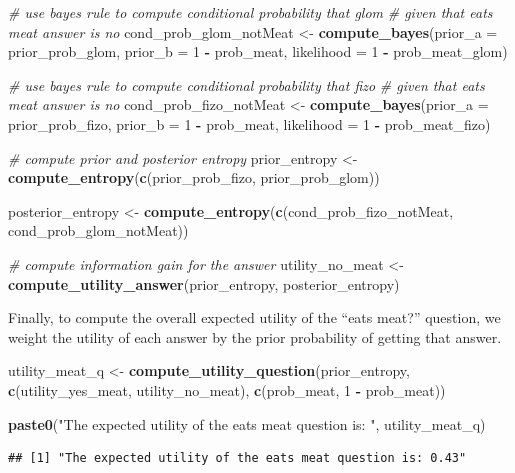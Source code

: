\documentclass[english,floatsintext,man]{apa6}
\newenvironment{Shaded}{\begin{snugshade}}{\end{snugshade}}
\newcommand{\KeywordTok}[1]{\textcolor[rgb]{0.13,0.29,0.53}{\textbf{#1}}}
\newcommand{\DataTypeTok}[1]{\textcolor[rgb]{0.13,0.29,0.53}{#1}}
\newcommand{\DecValTok}[1]{\textcolor[rgb]{0.00,0.00,0.81}{#1}}
\newcommand{\StringTok}[1]{\textcolor[rgb]{0.31,0.60,0.02}{#1}}
\newcommand{\CommentTok}[1]{\textcolor[rgb]{0.56,0.35,0.01}{\textit{#1}}}
\newcommand{\OperatorTok}[1]{\textcolor[rgb]{0.81,0.36,0.00}{\textbf{#1}}}
\newcommand{\NormalTok}[1]{#1}
\theoremstyle{definition}
\theoremstyle{definition}
\theoremstyle{definition}
\theoremstyle{remark}
\begin{document}
\begin{Shaded}
\begin{Highlighting}[]
\CommentTok{# use bayes rule to compute conditional probability that glom }
\CommentTok{# given that eats meat answer is no}
\NormalTok{cond_prob_glom_notMeat <-}\StringTok{ }\KeywordTok{compute_bayes}\NormalTok{(}\DataTypeTok{prior_a =}\NormalTok{ prior_prob_glom, }
                                        \DataTypeTok{prior_b =} \DecValTok{1} \OperatorTok{-}\StringTok{ }\NormalTok{prob_meat, }
                                        \DataTypeTok{likelihood =} \DecValTok{1} \OperatorTok{-}\StringTok{ }\NormalTok{prob_meat_glom)}

\CommentTok{# use bayes rule to compute conditional probability that fizo }
\CommentTok{# given that eats meat answer is no}
\NormalTok{cond_prob_fizo_notMeat <-}\StringTok{ }\KeywordTok{compute_bayes}\NormalTok{(}\DataTypeTok{prior_a =}\NormalTok{ prior_prob_fizo, }
                                        \DataTypeTok{prior_b =} \DecValTok{1} \OperatorTok{-}\StringTok{ }\NormalTok{prob_meat, }
                                        \DataTypeTok{likelihood =} \DecValTok{1} \OperatorTok{-}\StringTok{ }\NormalTok{prob_meat_fizo)}

\CommentTok{# compute prior and posterior entropy}
\NormalTok{prior_entropy <-}\StringTok{ }\KeywordTok{compute_entropy}\NormalTok{(}\KeywordTok{c}\NormalTok{(prior_prob_fizo, }
\NormalTok{                                   prior_prob_glom))}

\NormalTok{posterior_entropy <-}\StringTok{ }\KeywordTok{compute_entropy}\NormalTok{(}\KeywordTok{c}\NormalTok{(cond_prob_fizo_notMeat, }
\NormalTok{                                       cond_prob_glom_notMeat))}

\CommentTok{# compute information gain for the answer}
\NormalTok{utility_no_meat <-}\StringTok{ }\KeywordTok{compute_utility_answer}\NormalTok{(prior_entropy, }
\NormalTok{                                          posterior_entropy)}
\end{Highlighting}
\end{Shaded}

\noindent
Finally, to compute the overall expected utility of the \enquote{eats
meat?} question, we weight the utility of each answer by the prior
probability of getting that answer.

\begin{Shaded}
\begin{Highlighting}[]
\NormalTok{utility_meat_q <-}\StringTok{ }\KeywordTok{compute_utility_question}\NormalTok{(prior_entropy,}
                                           \KeywordTok{c}\NormalTok{(utility_yes_meat, utility_no_meat),}
                                           \KeywordTok{c}\NormalTok{(prob_meat, }\DecValTok{1} \OperatorTok{-}\StringTok{ }\NormalTok{prob_meat))}

\KeywordTok{paste0}\NormalTok{(}\StringTok{"The expected utility of the eats meat question is: "}\NormalTok{, utility_meat_q)}
\end{Highlighting}
\end{Shaded}

\begin{verbatim}
## [1] "The expected utility of the eats meat question is: 0.43"
\end{verbatim}
\end{document}

